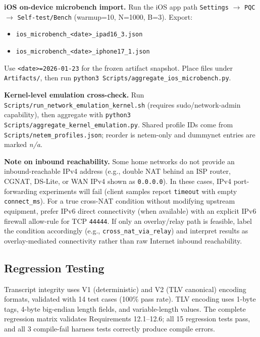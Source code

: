 \documentclass[10pt,journal,compsoc]{IEEEtran}
\providecommand{\tightlist}{%
	  \setlength{\itemsep}{0pt}\setlength{\parskip}{0pt}}
\begin{document}
\textbf{iOS on-device microbench import.}
Run the iOS app path
\texttt{Settings} $\rightarrow$ \texttt{PQC} $\rightarrow$
\texttt{Self-test/Bench} (warmup=10, N=1000, B=3). Export:
\begin{itemize}\tightlist
\item \texttt{ios\_microbench\_<date>\_ipad16\_3.json}
\item \texttt{ios\_microbench\_<date>\_iphone17\_1.json}
\end{itemize}
Use \texttt{<date>=2026-01-23} for the frozen artifact snapshot.
Place files under \texttt{Artifacts/}, then run
\texttt{python3 Scripts/\allowbreak aggregate\_\allowbreak ios\_\allowbreak microbench.py}.

\textbf{Kernel-level emulation cross-check.}
Run \texttt{Scripts/\allowbreak run\_\allowbreak network\_\allowbreak emulation\_\allowbreak kernel.sh}
(requires sudo/network-admin capability), then aggregate with
\texttt{python3 Scripts/\allowbreak aggregate\_\allowbreak kernel\_\allowbreak emulation.py}.
Shared profile IDs come from
\texttt{Scripts/\allowbreak netem\_\allowbreak profiles.json}; reorder is
netem-only and dummynet entries are marked \textit{n/a}.

\textbf{Note on inbound reachability.}
Some home networks do not provide an inbound-reachable IPv4 address (e.g., double NAT behind an ISP router, CGNAT, DS-Lite, or WAN IPv4 shown as \texttt{0.0.0.0}). In these cases, IPv4 port-forwarding experiments will fail (client samples report \texttt{timeout} with empty \texttt{connect\_ms}). For a true cross-NAT condition without modifying upstream equipment, prefer IPv6 direct connectivity (when available) with an explicit IPv6 firewall allow-rule for TCP \texttt{44444}. If only an overlay/relay path is feasible, label the condition accordingly (e.g., \texttt{cross\_nat\_via\_relay}) and interpret results as overlay-mediated connectivity rather than raw Internet inbound reachability.

\subsection*{Regression Testing}

Transcript integrity uses V1 (deterministic) and V2 (TLV canonical)
encoding formats, validated with 14 test cases (100\% pass rate). TLV
encoding uses 1-byte tags, 4-byte big-endian length fields, and
variable-length values. The complete regression matrix validates
Requirements 12.1--12.6; all 15 regression tests pass, and all 3
compile-fail harness tests correctly produce compile errors.
\end{document}
